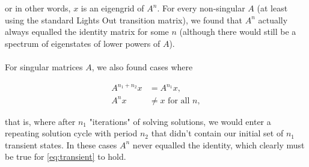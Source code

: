 \documentclass[11pt]{article}
\begin{document}
\noindent or in other words, $x$ is an eigengrid of $A^n$. For every non-singular $A$ (at least using the standard Lights Out transition matrix), we found that $A^n$ actually always equalled the identity matrix for some $n$ (although there would still be a spectrum of eigenstates of lower powers of $A$).

\paragraph{} For singular matrices $A$, we also found cases where

\begin{equation}
\begin{split}
  A^{n_1 + n_2}x & = A^{n_1}x,\\
  A^{n}x & \neq x \text{ for all } n,
\end{split}
\label{eq:transient}
\end{equation}

\noindent that is, where after $n_1$ "iterations" of solving solutions, we would enter a repeating solution cycle with period $n_2$ that didn't contain our initial set of $n_1$ transient states. In these cases $A^n$ never equalled the identity, which clearly must be true for \eqref{eq:transient} to hold.
\end{document}
